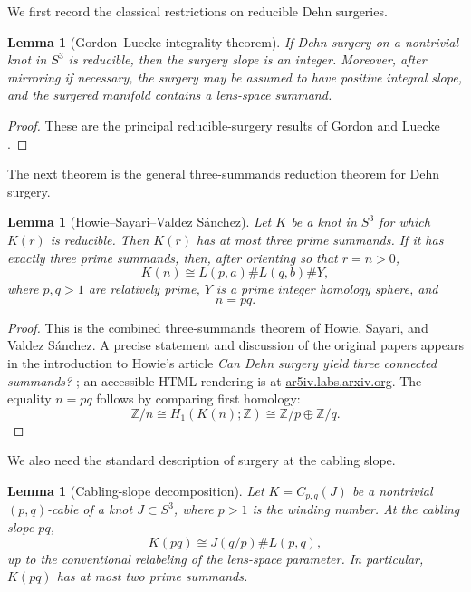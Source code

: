 \documentclass[11pt]{article}
\newtheorem{lemma}[theorem]{Lemma}
\theoremstyle{definition}
\theoremstyle{remark}
\newcommand{\Sthree}{S^{3}}
\newcommand{\ZZ}{\mathbb Z}
\begin{document}
We first record the classical restrictions on reducible Dehn surgeries.

\begin{lemma}[Gordon--Luecke integrality theorem]
\label{lem:GL}
If Dehn surgery on a nontrivial knot in $\Sthree$ is reducible, then the
surgery slope is an integer.  Moreover, after mirroring if necessary, the
surgery may be assumed to have positive integral slope, and the surgered
manifold contains a lens-space summand.
\end{lemma}

\begin{proof}
These are the principal reducible-surgery results of Gordon and Luecke
\cite{GLReducible}.
\end{proof}

The next theorem is the general three-summands reduction theorem for Dehn
surgery.

\begin{lemma}[Howie--Sayari--Valdez S\'anchez]
\label{lem:three-summands}
Let $K$ be a knot in $\Sthree$ for which $K(r)$ is reducible.  Then $K(r)$
has at most three prime summands.  If it has exactly three prime summands,
then, after orienting so that $r=n>0$,
\[
K(n)\cong L(p,a)\# L(q,b)\# Y,
\]
where $p,q>1$ are relatively prime, $Y$ is a prime integer homology sphere,
and
\[
n=pq.
\]
\end{lemma}

\begin{proof}
This is the combined three-summands theorem of Howie, Sayari, and Valdez
S\'anchez.  A precise statement and discussion of the original papers
appears in the introduction to Howie's article
\emph{Can Dehn surgery yield three connected summands?}
\cite{HowieThree}; an accessible HTML rendering is at
\href{https://ar5iv.labs.arxiv.org/html/0908.2697}{ar5iv.labs.arxiv.org}.
The equality $n=pq$ follows by comparing first homology:
\[
\ZZ/n\cong H_1(K(n);\ZZ)
       \cong \ZZ/p\oplus \ZZ/q.
\]
\end{proof}

We also need the standard description of surgery at the cabling slope.

\begin{lemma}[Cabling-slope decomposition]
\label{lem:cable-decomposition}
Let $K=C_{p,q}(J)$ be a nontrivial $(p,q)$-cable of a knot $J\subset
\Sthree$, where $p>1$ is the winding number.  At the cabling slope $pq$,
\[
K(pq)\cong J(q/p)\#L(p,q),
\]
up to the conventional relabeling of the lens-space parameter.  In
particular, $K(pq)$ has at most two prime summands.
\end{lemma}
\end{document}
